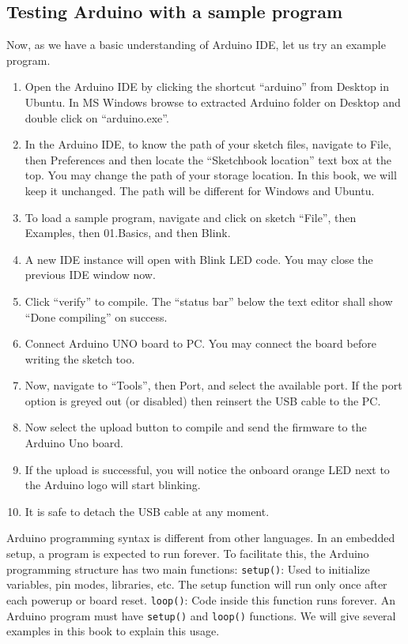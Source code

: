 \subsection{Testing Arduino with a sample program}
\label{sec:testing-arduino}
Now, as we have a basic understanding of Arduino IDE, let us try an
example program.
\begin{enumerate}
      \item Open the Arduino IDE by clicking the shortcut ``arduino'' from
            Desktop in Ubuntu. In MS Windows browse to extracted Arduino folder
            on Desktop and double click on ``arduino.exe''.
      \item In the Arduino IDE, to know the path of your sketch files,
            navigate to File, then Preferences and then locate the ``Sketchbook
            location'' text box at the top.  You may change the path of your
            storage location. In this book, we will keep it unchanged. The path
            will be different for Windows and Ubuntu.
      \item To load a sample program, navigate and click on sketch ``File'',
            then Examples, then 01.Basics, and then Blink.
      \item A new IDE instance will open with Blink LED code.  You may close
            the previous IDE window now.
      \item Click ``verify'' to compile. The ``status bar'' below the text editor
            shall show ``Done compiling'' on success.
      \item Connect Arduino UNO board to PC. You may connect the board
            before writing the sketch too.
      \item Now, navigate to ``Tools'', then Port, and select the available
            port. If the port option is greyed out (or disabled) then reinsert the
            USB cable to the PC.
      \item Now select the upload button to compile and send the firmware to
            the Arduino Uno board.
      \item If the upload is successful, you will notice the onboard orange LED
            next to the Arduino logo will start blinking.
      \item It is safe to detach the USB cable at any moment.
\end{enumerate}

Arduino programming syntax is different from other languages. In an
embedded setup, a program is expected to run forever. To facilitate
this, the Arduino programming structure has two main functions: {\tt setup()}:
Used to initialize variables, pin modes, libraries, etc. The setup
function will run only once after each powerup or board reset.
{\tt loop()}: Code inside this function runs forever. An Arduino program
must have {\tt setup()} and {\tt loop()} functions.  We will give several examples
in this book to explain this usage.

